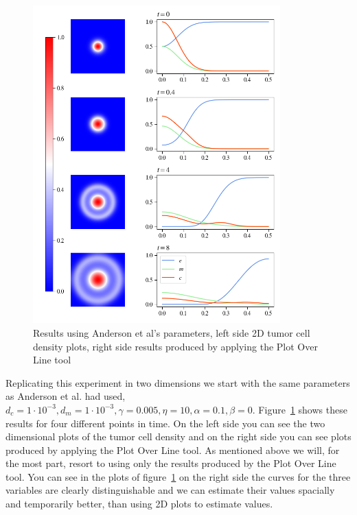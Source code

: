\begin{figure}[ht!]
    \centering
    \includegraphics[width=0.85\textwidth]{resources/images/first_replication_results.png}
    \caption{Results using Anderson et al's parameters, left side 2D tumor cell density plots, right side results produced by applying the Plot Over Line tool}
    \label{fig:unadjsuted_replication}
\end{figure}
Replicating this experiment in two dimensions we start with the same parameters as Anderson et al. had used, $d_c = 1\cdot 10^{-3}, d_m = 1\cdot 10^{-3}, \gamma = 0.005, \eta = 10, \alpha = 0.1, \beta = 0$. Figure~\ref{fig:unadjsuted_replication} shows these results for four different points in time. On the left side you can see the two dimensional plots of the tumor cell density and on the right side you can see plots produced by applying the Plot Over Line tool. As mentioned above we will, for the most part, resort to using only the results produced by the Plot Over Line tool. You can see in the plots of figure~\ref{fig:unadjsuted_replication} on the right side the curves for the three variables are clearly distinguishable and we can estimate their values spacially and temporarily better, than using 2D plots to estimate values.\newline
